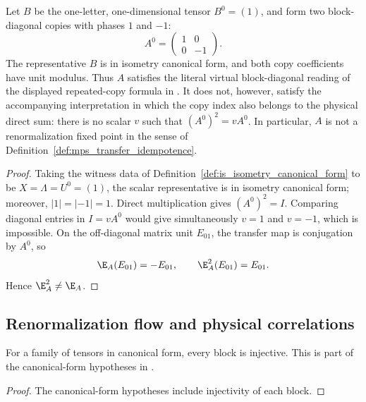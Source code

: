 \begin{theorem}%
    \label{thm:phase_flip_tensor_not_rfp}
    \leanok
    Let $B$ be the one-letter, one-dimensional tensor $B^0=(1)$, and form two
    block-diagonal copies with phases $1$ and $-1$:
    \[
        A^0=\begin{pmatrix}1&0\\0&-1\end{pmatrix}.
    \]
    The representative $B$ is in isometry canonical form, and both copy
    coefficients have unit modulus. Thus $A$ satisfies the literal virtual
    block-diagonal reading of the displayed repeated-copy formula in
    \cite[Section~3]{Cirac2016MPDO_arXiv}. It does not, however, satisfy the
    accompanying interpretation in which the copy index also belongs to the
    physical direct sum: there is no scalar $v$ such that
    $(A^0)^2=vA^0$. In particular, $A$ is not a renormalization fixed point
    in the sense of Definition~\ref{def:mps_transfer_idempotence}.
\end{theorem}
\begin{proof}\leanok
    Taking the witness data of
    Definition~\ref{def:is_isometry_canonical_form} to be
    $X=\Lambda=U^0=(1)$, the scalar representative is in isometry canonical
    form; moreover,
    $|1|=|-1|=1$.
    Direct multiplication gives $(A^0)^2=I$. Comparing diagonal entries in
    $I=vA^0$ would give simultaneously $v=1$ and $v=-1$, which is impossible.
    On the off-diagonal matrix unit $E_{01}$, the transfer map is conjugation by
    $A^0$, so
    \[
        \E_A(E_{01})=-E_{01},\qquad
        \E_A^2(E_{01})=E_{01}.
    \]
    Hence $\E_A^2\ne\E_A$.
\end{proof}

\subsection{Renormalization flow and physical correlations}

\begin{theorem}\label{thm:rfp_cf_structural}
    \leanok
    For a family of tensors in canonical form, every block is injective.
    This is part of the canonical-form hypotheses in
    \cite[Section~2.3]{Cirac2016MPDO_arXiv}.
\end{theorem}
\begin{proof}\leanok
    The canonical-form hypotheses include injectivity of each block.
\end{proof}


